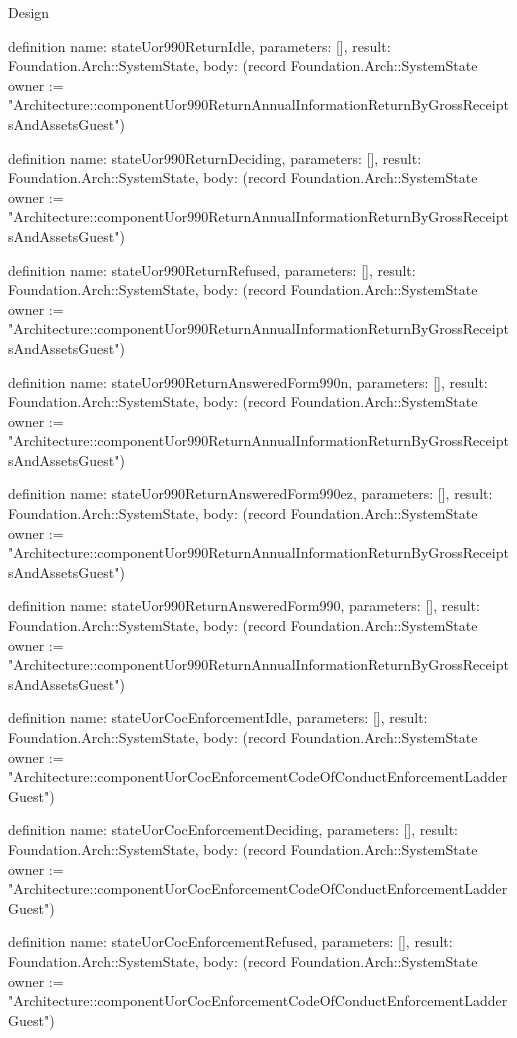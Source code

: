 \begin{lexlean}{Design}
\begin{semanticmodule}
definition{
  name: stateUor990ReturnIdle,
  parameters: [],
  result: Foundation.Arch::SystemState,
  body: (record Foundation.Arch::SystemState {owner := "Architecture::componentUor990ReturnAnnualInformationReturnByGrossReceiptsAndAssetsGuest"})
}

definition{
  name: stateUor990ReturnDeciding,
  parameters: [],
  result: Foundation.Arch::SystemState,
  body: (record Foundation.Arch::SystemState {owner := "Architecture::componentUor990ReturnAnnualInformationReturnByGrossReceiptsAndAssetsGuest"})
}

definition{
  name: stateUor990ReturnRefused,
  parameters: [],
  result: Foundation.Arch::SystemState,
  body: (record Foundation.Arch::SystemState {owner := "Architecture::componentUor990ReturnAnnualInformationReturnByGrossReceiptsAndAssetsGuest"})
}

definition{
  name: stateUor990ReturnAnsweredForm990n,
  parameters: [],
  result: Foundation.Arch::SystemState,
  body: (record Foundation.Arch::SystemState {owner := "Architecture::componentUor990ReturnAnnualInformationReturnByGrossReceiptsAndAssetsGuest"})
}

definition{
  name: stateUor990ReturnAnsweredForm990ez,
  parameters: [],
  result: Foundation.Arch::SystemState,
  body: (record Foundation.Arch::SystemState {owner := "Architecture::componentUor990ReturnAnnualInformationReturnByGrossReceiptsAndAssetsGuest"})
}

definition{
  name: stateUor990ReturnAnsweredForm990,
  parameters: [],
  result: Foundation.Arch::SystemState,
  body: (record Foundation.Arch::SystemState {owner := "Architecture::componentUor990ReturnAnnualInformationReturnByGrossReceiptsAndAssetsGuest"})
}

definition{
  name: stateUorCocEnforcementIdle,
  parameters: [],
  result: Foundation.Arch::SystemState,
  body: (record Foundation.Arch::SystemState {owner := "Architecture::componentUorCocEnforcementCodeOfConductEnforcementLadderGuest"})
}

definition{
  name: stateUorCocEnforcementDeciding,
  parameters: [],
  result: Foundation.Arch::SystemState,
  body: (record Foundation.Arch::SystemState {owner := "Architecture::componentUorCocEnforcementCodeOfConductEnforcementLadderGuest"})
}

definition{
  name: stateUorCocEnforcementRefused,
  parameters: [],
  result: Foundation.Arch::SystemState,
  body: (record Foundation.Arch::SystemState {owner := "Architecture::componentUorCocEnforcementCodeOfConductEnforcementLadderGuest"})
}


\end{semanticmodule}
\end{lexlean}
